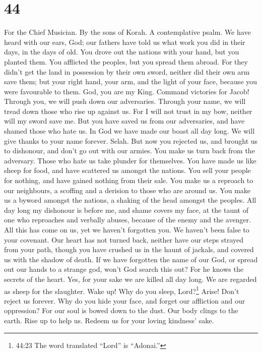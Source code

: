 \hypertarget{section-43}{%
\section{44}\label{section-43}}

For the Chief Musician. By the sons of Korah. A contemplative psalm.
 We have heard with our ears, God; our fathers have told us
what work you did in their days, in the days of old.  You
drove out the nations with your hand, but you planted them. You
afflicted the peoples, but you spread them abroad.  For they
didn't get the land in possession by their own sword, neither did their
own arm save them; but your right hand, your arm, and the light of your
face, because you were favourable to them.  God, you are my
King. Command victories for Jacob!  Through you, we will
push down our adversaries. Through your name, we will tread down those
who rise up against us.  For I will not trust in my bow,
neither will my sword save me.  But you have saved us from
our adversaries, and have shamed those who hate us.  In God
we have made our boast all day long. We will give thanks to your name
forever. Selah.  But now you rejected us, and brought us to
dishonour, and don't go out with our armies.  You make us
turn back from the adversary. Those who hate us take plunder for
themselves.  You have made us like sheep for food, and have
scattered us amongst the nations.  You sell your people for
nothing, and have gained nothing from their sale.  You make
us a reproach to our neighbours, a scoffing and a derision to those who
are around us.  You make us a byword amongst the nations, a
shaking of the head amongst the peoples.  All day long my
dishonour is before me, and shame covers my face,  at the
taunt of one who reproaches and verbally abuses, because of the enemy
and the avenger.  All this has come on us, yet we haven't
forgotten you. We haven't been false to your covenant.  Our
heart has not turned back, neither have our steps strayed from your
path,  though you have crushed us in the haunt of jackals,
and covered us with the shadow of death.  If we have
forgotten the name of our God, or spread out our hands to a strange god,
 won't God search this out? For he knows the secrets of the
heart.  Yes, for your sake we are killed all day long. We
are regarded as sheep for the slaughter.  Wake up! Why do
you sleep, Lord?\footnote{44:23 The word translated ``Lord'' is
  ``Adonai.''} Arise! Don't reject us forever.  Why do you
hide your face, and forget our affliction and our oppression?
 For our soul is bowed down to the dust. Our body clings to
the earth.  Rise up to help us. Redeem us for your loving
kindness' sake.

